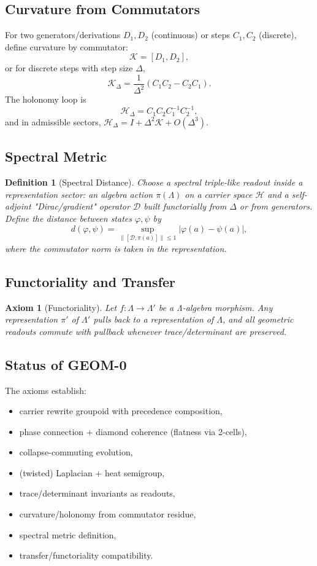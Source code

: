 \documentclass[12pt, oneside]{article}
\newtheorem{definition}[theorem]{Definition}
\newtheorem{axiom}[theorem]{Axiom}
\begin{document}
\subsection{Curvature from Commutators}

For two generators/derivations $D_1, D_2$ (continuous) or steps $C_1, C_2$ (discrete), define curvature by commutator:
\[
\mathcal{K} = [D_1, D_2],
\]
or for discrete steps with step size $\Delta$,
\[
\mathcal{K}_\Delta = \frac{1}{\Delta^2}(C_1 C_2 - C_2 C_1).
\]
The holonomy loop is
\[
\mathcal{H}_\Delta = C_1 C_2 C_1^{-1} C_2^{-1},
\]
and in admissible sectors, $\mathcal{H}_\Delta = I + \Delta^2 \mathcal{K} + O(\Delta^3)$.

\subsection{Spectral Metric}

\begin{definition}[Spectral Distance]
Choose a spectral triple-like readout inside a representation sector: an algebra action $\pi(\Lambda)$ on a carrier space $\mathcal{H}$ and a self-adjoint "Dirac/gradient" operator $\mathcal{D}$ built functorially from $\Delta$ or from generators. Define the distance between states $\varphi, \psi$ by
\[
d(\varphi, \psi) = \sup_{\| [\mathcal{D}, \pi(a)] \| \le 1} |\varphi(a) - \psi(a)|,
\]
where the commutator norm is taken in the representation.
\end{definition}

\subsection{Functoriality and Transfer}

\begin{axiom}[Functoriality]
Let $f: \Lambda \to \Lambda'$ be a Λ-algebra morphism. Any representation $\pi'$ of $\Lambda'$ pulls back to a representation of $\Lambda$, and all geometric readouts commute with pullback whenever trace/determinant are preserved.
\end{axiom}

\subsection{Status of GEOM-0}

The axioms establish:
\begin{itemize}
    \item carrier rewrite groupoid with precedence composition,
    \item phase connection + diamond coherence (flatness via 2-cells),
    \item collapse-commuting evolution,
    \item (twisted) Laplacian + heat semigroup,
    \item trace/determinant invariants as readouts,
    \item curvature/holonomy from commutator residue,
    \item spectral metric definition,
    \item transfer/functoriality compatibility.
\end{itemize}
\end{document}
